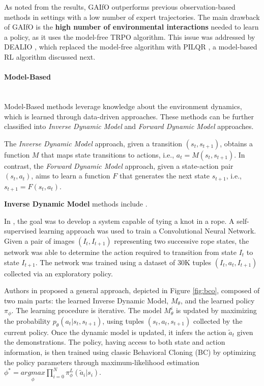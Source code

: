 As noted from the results, GAIfO outperforms previous observation-based methods \cite{sermanet2018time_contrastive,torabi2018bco} in settings with a low number of expert trajectories. The main drawback of GAIfO is the \textbf{high number of environmental interactions} needed to learn a policy, as it uses the model-free TRPO \cite{schulman2015trpo} algorithm. This issue was addressed by DEALIO \cite{torabi2021dealio}, which replaced the model-free algorithm with PILQR \cite{chebotar2017pilqr}, a model-based RL algorithm discussed next.



\paragraph*{Model-Based}\mbox{}\\
Model-Based methods leverage knowledge about the environment dynamics, which is learned through data-driven approaches. These methods can be further classified into \textit{Inverse Dynamic Model} and \textit{Forward Dynamic Model} approaches. 

The \textit{Inverse Dynamic Model} approach, given a transition $(s_{t}, s_{t+1})$, obtains a function $M$ that maps state transitions to actions, i.e., $a_{t} = M(s_{t}, s_{t+1})$. In contrast, the \textit{Forward Dynamic Model} approach, given a state-action pair $(s_{t}, a_{t})$, aims to learn a function $F$ that generates the next state $s_{t+1}$, i.e., $s_{t+1} = F(s_{t}, a_{t})$.

\textbf{Inverse Dynamic Model} methods include \cite{nair2017combining,torabi2018bco,guo2019hybrid_rl,radosavovic2021state_only_demo}.

In \cite{nair2017combining}, the goal was to develop a system capable of tying a knot in a rope. A self-supervised learning approach was used to train a Convolutional Neural Network. Given a pair of images $(I_{t}, I_{t+1})$ representing two successive rope states, the network was able to determine the action required to transition from state $I_{t}$ to state $I_{t+1}$. The network was trained using a dataset of 30K tuples $(I_{t}, a_{t}, I_{t+1})$ collected via an exploratory policy.

Authors in \cite{torabi2018bco} proposed a general approach, depicted in Figure \ref{fig:bco}, composed of two main parts: the learned Inverse Dynamic Model, $M_{\theta}$, and the learned policy $\pi_{\phi}$. The learning procedure is iterative. The model $M_{\theta}^{i}$ is updated by maximizing the probability $p_{\theta}(a_{t}|s_{t}, s_{t+1})$, using tuples $(s_{t}, a_{t}, s_{t+1})$ collected by the current policy. Once the dynamic model is updated, it infers the action $\tilde{a}_{t}$ given the demonstrations. The policy, having access to both state and action information, is then trained using classic Behavioral Cloning (BC) by optimizing the policy parameters through maximum-likelihood estimation $\phi^{*} = \underset{\phi}{argmax} \prod_{i=0}^{N} \pi^{L}_{\phi}(\tilde{a}_{i}|s_{i})$.

